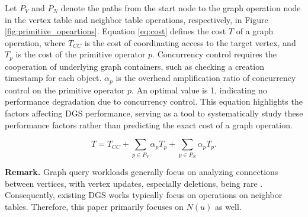 Let $P_V$ and $P_N$ denote the paths from the start node to the graph operation node in the vertex table and neighbor table operations, respectively, in Figure \ref{fig:primitive_opeartions}. Equation \ref{eq:cost} defines the cost $T$ of a graph operation, where $T_{CC}$ is the cost of coordinating access to the target vertex, and $T_p$ is the cost of the primitive operator $p$. Concurrency control requires the cooperation of underlying graph containers, such as checking a creation timestamp for each object. $\alpha_p$ is the overhead amplification ratio of concurrency control on the primitive operator $p$. An optimal value is 1, indicating no performance degradation due to concurrency control. This equation highlights the factors affecting DGS performance, serving as a tool to systematically study these performance factors rather than predicting the exact cost of a graph operation.

\begin{equation} \label{eq:cost}
T = T_{CC} + \sum_{p \in P_V} \alpha_p T_p + \sum_{p \in P_N} \alpha_p T_p.
\end{equation}

\noindent\textbf{Remark. }  Graph query workloads generally focus on analyzing connections between vertices, with vertex updates, especially deletions, being rare \cite{zhu2019livegraph}. Consequently, existing DGS works typically focus on operations on neighbor tables. Therefore, this paper primarily focuses on $N(u)$ as well.
